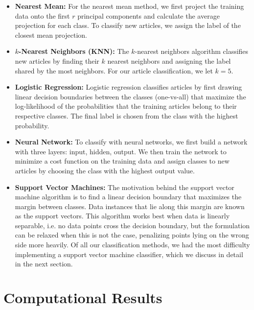 \documentclass[12pt]{article}
\begin{document}
\begin{itemize}
\item \textbf{Nearest Mean:} For the nearest mean method, we first project the training data onto
the first $r$ principal components and calculate the average projection for each class. To classify new articles, we assign the label of the closest mean projection.

\item \textbf{$k$-Nearest Neighbors (KNN):} The $k$-nearest neighbors algorithm classifies new articles by
finding their $k$ nearest neighbors and assigning the label shared by the most neighbors. For our article classification, we let $k = 5$.

\item \textbf{Logistic Regression:} Logistic regression classifies articles by first drawing linear decision
boundaries between the classes (one-vs-all) that maximize the log-likelihood of the probabilities that the training articles belong to their respective classes. The final label is chosen from the class with the highest probability.

\item \textbf{Neural Network:} To classify with neural networks, we first build a network with three
layers: input, hidden, output. We then train the network to minimize a cost function on the training data and assign classes to new articles by choosing the class with the highest output value.

\item \textbf{Support Vector Machines:} The motivation behind the support vector machine algorithm is to find a linear decision boundary that maximizes the margin between classes. Data instances that lie along this margin are known as the support vectors. This algorithm works best when data is linearly separable, i.e. no data points cross the decision boundary, but the formulation can be relaxed when this is not the case, penalizing points lying on the wrong side more heavily. Of all our classification methods, we had the most difficulty implementing a support vector machine classifier, which we discuss in detail in the next section.
\end{itemize}

\section{Computational Results}

\end{document}

